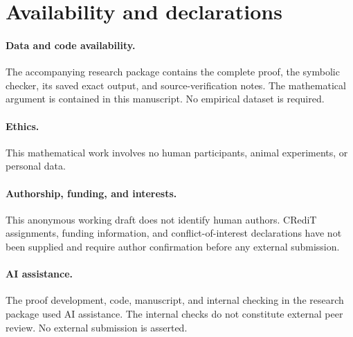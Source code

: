\section*{Availability and declarations}

\paragraph{Data and code availability.}
The accompanying research package contains the complete proof,
the symbolic checker, its saved exact output, and source-verification
notes. The mathematical argument is contained in this manuscript.
No empirical dataset is required.

\paragraph{Ethics.}
This mathematical work involves no human participants, animal
experiments, or personal data.

\paragraph{Authorship, funding, and interests.}
This anonymous working draft does not identify human authors.
CRediT assignments, funding information, and conflict-of-interest
declarations have not been supplied and require author confirmation
before any external submission.

\paragraph{AI assistance.}
The proof development, code, manuscript, and internal checking in
the research package used AI assistance. The internal checks do not
constitute external peer review. No external submission is asserted.
